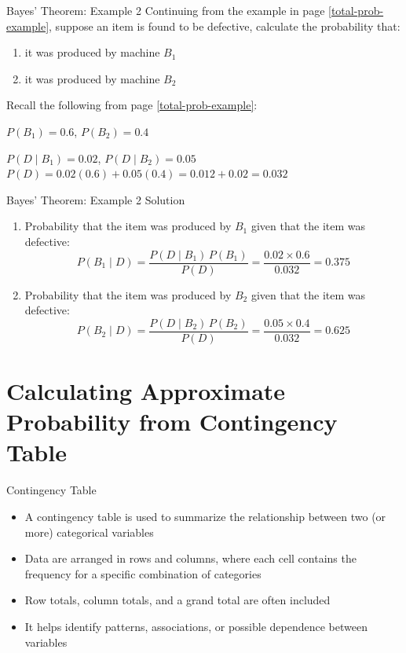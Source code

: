 \documentclass[12pt, aspectratio=169]{beamer}
\begin{document}
	\begin{frame}{Bayes' Theorem: Example 2}
		Continuing from the example in page \ref{total-prob-example}, suppose an item is found to be defective, calculate the probability that:
		\begin{enumerate}
			\item it was produced by machine $B_1$
			\item it was produced by machine $B_2$
		\end{enumerate}
		
		\vspace{1em}

		Recall the following from page \ref{total-prob-example}:

		\(P(B_1)=0.6\), \quad \(P(B_2)=0.4\)

		\(P(D \mid B_1)=0.02\), \quad \(P(D \mid B_2)=0.05\)
		\(
			P(D)=0.02(0.6)+0.05(0.4)=0.012+0.02=0.032
		\)
	\end{frame}


	\begin{frame}{Bayes' Theorem: Example 2 Solution}
		\begin{enumerate}
			\item Probability that the item was produced by $B_1$ given that the item was defective:
			\[
				P(B_1 \mid D) = \frac{P(D \mid B_1) \, P(B_1)}{P(D)} = \frac{0.02 \times 0.6}{0.032} = 0.375
			\]
			\item Probability that the item was produced by $B_2$ given that the item was defective:
			\[
				P(B_2 \mid D) = \frac{P(D \mid B_2) \, P(B_2)}{P(D)} = \frac{0.05 \times 0.4}{0.032} = 0.625
			\]
		\end{enumerate}
	\end{frame}


	\section{Calculating Approximate Probability from Contingency Table}

	\begin{frame}{Contingency Table}
        \begin{itemize}
            \item A contingency table is used to summarize the relationship between two (or more) categorical variables
            \item Data are arranged in rows and columns, where each cell contains the frequency for a specific combination of categories
            \item Row totals, column totals, and a grand total are often included
            \item It helps identify patterns, associations, or possible dependence between variables
        \end{itemize}
    \end{frame}
\end{document}
